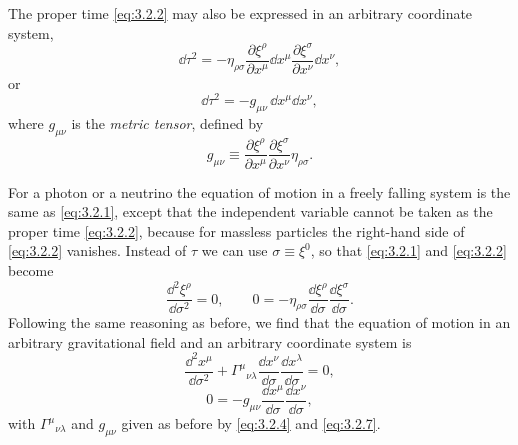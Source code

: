 The proper time \eqref{eq:3.2.2} may also be expressed in an arbitrary
coordinate system,
\begin{equation}
  \dd\tau^2
  =-\eta_{\rho\sigma}
  \frac{\partial\xi^\rho}{\partial x^\mu}\dd x^\mu
  \frac{\partial\xi^\sigma}{\partial x^\nu}\dd x^\nu,
  \tag{3.2.5}\label{eq:3.2.5}
\end{equation}
or
\begin{equation}
  \dd\tau^2=-g_{\mu\nu}\,\dd x^\mu\dd x^\nu,
  \tag{3.2.6}\label{eq:3.2.6}
\end{equation}
where $g_{\mu\nu}$ is the \emph{metric tensor}, defined by
\begin{equation}
  g_{\mu\nu}\equiv
  \frac{\partial\xi^\rho}{\partial x^\mu}
  \frac{\partial\xi^\sigma}{\partial x^\nu}\eta_{\rho\sigma}.
  \tag{3.2.7}\label{eq:3.2.7}
\end{equation}

For a photon or a neutrino the equation of motion in a freely falling system
is the same as \eqref{eq:3.2.1}, except that the independent variable cannot
be taken as the proper time \eqref{eq:3.2.2}, because for massless particles
the right-hand side of \eqref{eq:3.2.2} vanishes. Instead of $\tau$ we can
use $\sigma\equiv\xi^0$, so that \eqref{eq:3.2.1} and \eqref{eq:3.2.2}
become
\[
  \frac{\dd^2\xi^\rho}{\dd\sigma^2}=0,
  \qquad
  0=-\eta_{\rho\sigma}
  \frac{\dd\xi^\rho}{\dd\sigma}\frac{\dd\xi^\sigma}{\dd\sigma}.
\]
Following the same reasoning as before, we find that the equation of motion
in an arbitrary gravitational field and an arbitrary coordinate system is
\begin{equation}
  \frac{\dd^2x^\mu}{\dd\sigma^2}
  +\Gamma^\mu{}_{\nu\lambda}
  \frac{\dd x^\nu}{\dd\sigma}\frac{\dd x^\lambda}{\dd\sigma}=0,
  \tag{3.2.8}\label{eq:3.2.8}
\end{equation}
\begin{equation}
  0=-g_{\mu\nu}
  \frac{\dd x^\mu}{\dd\sigma}\frac{\dd x^\nu}{\dd\sigma},
  \tag{3.2.9}\label{eq:3.2.9}
\end{equation}
with $\Gamma^\mu{}_{\nu\lambda}$ and $g_{\mu\nu}$ given as before by
\eqref{eq:3.2.4} and \eqref{eq:3.2.7}.

